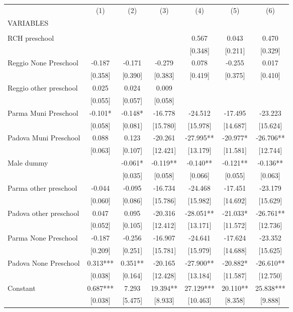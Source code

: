 \begin{tabular}{lcccccc} \hline
 & (1) & (2) & (3) & (4) & (5) & (6) \\
VARIABLES &  &  &  &  &  &  \\ \hline
 &  &  &  &  &  &  \\
RCH preschool &  &  &  & 0.567 & 0.043 & 0.470 \\
 &  &  &  & [0.348] & [0.211] & [0.329] \\
Reggio None Preschool & -0.187 & -0.171 & -0.279 & 0.078 & -0.255 & 0.017 \\
 & [0.358] & [0.390] & [0.383] & [0.419] & [0.375] & [0.410] \\
Reggio other preschool & 0.025 & 0.024 & 0.009 &  &  &  \\
 & [0.055] & [0.057] & [0.058] &  &  &  \\
Parma Muni Preschool & -0.101* & -0.148* & -16.778 & -24.512 & -17.495 & -23.223 \\
 & [0.058] & [0.081] & [15.780] & [15.978] & [14.687] & [15.624] \\
Padova Muni Preschool & 0.088 & 0.123 & -20.261 & -27.995** & -20.977* & -26.706** \\
 & [0.063] & [0.107] & [12.421] & [13.179] & [11.581] & [12.744] \\
Male dummy &  & -0.061* & -0.119** & -0.140** & -0.121** & -0.136** \\
 &  & [0.035] & [0.058] & [0.066] & [0.055] & [0.063] \\
Parma other preschool & -0.044 & -0.095 & -16.734 & -24.468 & -17.451 & -23.179 \\
 & [0.060] & [0.086] & [15.786] & [15.982] & [14.692] & [15.629] \\
Padova other preschool & 0.047 & 0.095 & -20.316 & -28.051** & -21.033* & -26.761** \\
 & [0.052] & [0.105] & [12.412] & [13.171] & [11.572] & [12.736] \\
Parma None Preschool & -0.187 & -0.256 & -16.907 & -24.641 & -17.624 & -23.352 \\
 & [0.209] & [0.251] & [15.781] & [15.979] & [14.688] & [15.625] \\
Padova None Preschool & 0.313*** & 0.351** & -20.165 & -27.900** & -20.882* & -26.610** \\
 & [0.038] & [0.164] & [12.428] & [13.184] & [11.587] & [12.750] \\
Constant & 0.687*** & 7.293 & 19.394** & 27.129*** & 20.110** & 25.838*** \\
 & [0.038] & [5.475] & [8.933] & [10.463] & [8.358] & [9.888] \\

\end{tabular}
